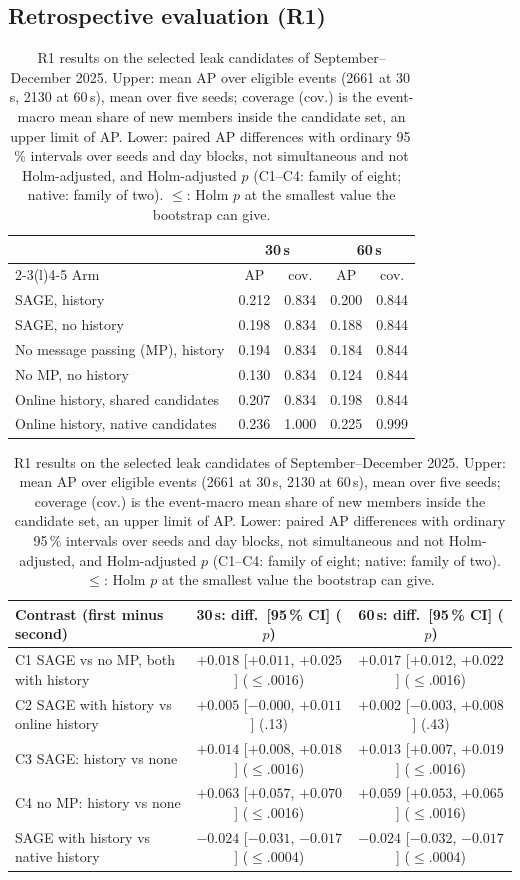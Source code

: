 \subsection{Retrospective evaluation (R1)}\label{sec:forecast-r1}
\begin{table}[t]
\caption{R1 results on the selected leak candidates of September--December 2025. Upper: mean AP over eligible events (\num{2661} at 30\,s, \num{2130} at 60\,s), mean over five seeds; coverage (cov.) is the event-macro mean share of new members inside the candidate set, an upper limit of AP. Lower: paired AP differences with ordinary 95\,\% intervals over seeds and day blocks, not simultaneous and not Holm-adjusted, and Holm-adjusted $p$ (C1--C4: family of eight; native: family of two). ${\leq}$: Holm $p$ at the smallest value the bootstrap can give.}
\label{tab:r1}
\small
\setlength{\tabcolsep}{3pt}
\begin{tabular}[t]{@{}lcccc@{}}
\toprule
 & \multicolumn{2}{c}{30\,s} & \multicolumn{2}{c}{60\,s} \\
\cmidrule(lr){2-3}\cmidrule(l){4-5}
Arm & AP & cov. & AP & cov. \\
\midrule
SAGE, history & 0.212 & 0.834 & 0.200 & 0.844 \\
SAGE, no history & 0.198 & 0.834 & 0.188 & 0.844 \\
No message passing (MP), history & 0.194 & 0.834 & 0.184 & 0.844 \\
No MP, no history & 0.130 & 0.834 & 0.124 & 0.844 \\
Online history, shared candidates & 0.207 & 0.834 & 0.198 & 0.844 \\
Online history, native candidates & 0.236 & 1.000 & 0.225 & 0.999 \\
\bottomrule
\end{tabular}\hfill
\begin{tabular}[t]{@{}lcc@{}}
\toprule
Contrast (first minus second) & 30\,s: diff.\ [95\,\% CI] ($p$) & 60\,s: diff.\ [95\,\% CI] ($p$) \\
\midrule
C1 SAGE vs no MP, both with history & $+0.018$ [$+0.011$, $+0.025$] (${\leq}$.0016) & $+0.017$ [$+0.012$, $+0.022$] (${\leq}$.0016) \\
C2 SAGE with history vs online history & $+0.005$ [$-0.000$, $+0.011$] (.13) & $+0.002$ [$-0.003$, $+0.008$] (.43) \\
C3 SAGE: history vs none & $+0.014$ [$+0.008$, $+0.018$] (${\leq}$.0016) & $+0.013$ [$+0.007$, $+0.019$] (${\leq}$.0016) \\
C4 no MP: history vs none & $+0.063$ [$+0.057$, $+0.070$] (${\leq}$.0016) & $+0.059$ [$+0.053$, $+0.065$] (${\leq}$.0016) \\
SAGE with history vs native history & $-0.024$ [$-0.031$, $-0.017$] (${\leq}$.0004) & $-0.024$ [$-0.032$, $-0.017$] (${\leq}$.0004) \\
\bottomrule
\end{tabular}
\end{table}

